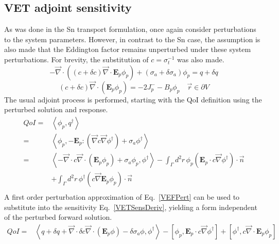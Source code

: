 \documentclass{article}
\newcommand{\vr}{\vec{r}}
\newcommand{\bra}{\left\langle}
\newcommand{\ket}{\right\rangle}
\newcommand{\sbra}{\left[}
\newcommand{\sket}{\right]}
\newcommand{\vdiv}{\vec{\nabla} \cdot}
\newcommand{\vgrad}{\vec{\nabla}}
\newcommand{\bound}{\partial V}
\newcommand{\Edd}{\mathbf{E}}
\newcommand{\sigt}{\sigma_t}
\newcommand{\siga}{\sigma_a}
\newcommand{\isigt}{c}
\newcommand{\scalSource}{q}
\newcommand{\scalResp}{q^\dag}
\newcommand{\qoi}{QoI}
\begin{document}
\subsection{VET adjoint sensitivity}

As was done in the Sn transport formulation, once again consider perturbations to the system parameters. However, in contrast to the Sn case, the assumption is also made that the Eddington factor remains unperturbed under these system perturbations. For brevity, the substitution of $\isigt = \sigt^{-1}$ was also made.
\begin{equation}
\label{VEFPert}
- \vdiv \left((\isigt + \delta \isigt)\vdiv \Edd_p \phi_p \right) + (\siga + \delta \siga)\phi_p = \scalSource + \delta \scalSource
\end{equation}
\begin{equation}
(\isigt + \delta \isigt) \vec{\nabla} \cdot \left(\Edd_p \phi_p \right)  = - 2J_p^- - B_p \phi_p \quad \vr \in \bound
\end{equation}
The usual adjoint process is performed, starting with the QoI definition using the perturbed solution and response. 
\begin{equation}
\label{VETSensDeriv}
\begin{split}
\qoi=&\bra \phi_p , \scalResp \ket \\
=&\bra \phi_p , - \Edd_p : \left( \vgrad \isigt \vgrad \phi^\dag \right) + \siga \phi^\dag \ket \\
=& \bra - \vdiv \isigt \vdiv \left( \Edd_p \phi_p \right) + \siga \phi_p, \phi^\dag \ket 
- \int_\Gamma d^2 r \, \phi_p \left( \Edd_p \cdot \isigt \vgrad \phi^\dag \right) \cdot \vec{n}  \\ 
&+ \int_\Gamma d^2 r \, \phi^\dag \left(  \isigt \vgrad \Edd_p \phi_p \right) \cdot \vec{n} \\
\end{split}
\end{equation}
A first order perturbation approximation of Eq.~\eqref{VEFPert} can be used to substitute into the sensitivity Eq.~\eqref{VETSensDeriv}, yielding a form independent of the perturbed forward solution.
\begin{equation}
\label{QoIVETAdjNoBC}
\begin{split}
\qoi =& \bra \scalSource + \delta \scalSource + \vdiv \delta \isigt \vdiv \left( \Edd_p \phi \right) - \delta \siga \phi, \phi^\dag \ket - \sbra \phi_p, \Edd_p \cdot \isigt \vgrad \phi^\dag \sket + \sbra \phi^\dag, \isigt \vdiv \Edd_p \phi_p \sket 
\end{split}
\end{equation}
\end{document}
